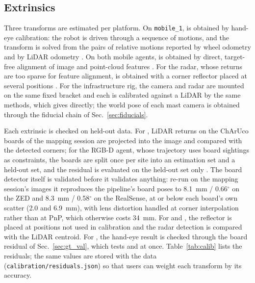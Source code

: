 \subsection{Extrinsics}
\label{sec:spatial}
Three transforms are estimated per platform. On \texttt{mobile\_1},
 is obtained by hand-eye calibration: the
robot is driven through a sequence of motions, and the transform is
solved from the pairs of relative motions reported by wheel odometry
and by LiDAR odometry \cite{furrer2018handeye}. On both mobile agents,
 is obtained by direct, target-free alignment
of image and point-cloud features \cite{koide2023lidarcam}. For the
radar, whose returns are too sparse for feature alignment,
 is obtained with a corner reflector placed at
several positions \cite{domhof2019calib}. For the infrastructure rig,
the camera and radar are mounted on the same fixed bracket and each is
calibrated against a LiDAR by the same methods, which gives
 directly; the world pose of each mast camera
is obtained through the fiducial chain of Sec.~\ref{sec:fiducials}.

Each extrinsic is checked on held-out data. For
, LiDAR returns on the ChArUco boards of the
mapping session are projected into the image and compared with the
detected corners; for the RGB-D agent, whose trajectory uses board
sightings as constraints, the boards are split once per site into an
estimation set and a held-out set, and the residual is evaluated on
the held-out set only . The board detector
itself is validated before it validates anything: re-run on the
mapping session's images it reproduces the pipeline's board poses to
\SI{8.1}{\milli\metre} / 0.66$^\circ$ on the ZED and
\SI{8.3}{\milli\metre} / 0.58$^\circ$ on the RealSense, at or below
each board's own scatter (\SI{2.0}{} and \SI{6.9}{\milli\metre}),
with lens distortion handled at corner interpolation rather than at
PnP, which otherwise costs \SI{34}{\milli\metre}. For
 and , the reflector
is placed at positions not used in calibration and the radar detection
is compared with the LiDAR centroid. For , the
hand-eye result is checked through the board residual of
Sec.~\ref{sec:gt_val}, which tests  and
 at once. Table~\ref{tab:calib} lists the
residuals; the same values are stored with the data
(\texttt{calibration/residuals.json}) so that users can weight each
transform by its accuracy.


